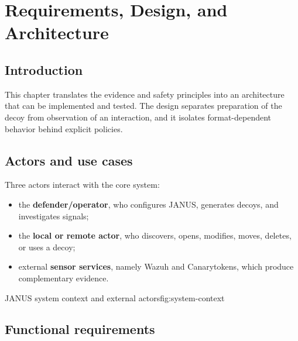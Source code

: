 \chapter{Requirements, Design, and Architecture}

\section{Introduction}

This chapter translates the evidence and safety principles into an architecture
that can be implemented and tested. The design separates preparation of the
decoy from observation of an interaction, and it isolates format-dependent
behavior behind explicit policies.

\section{Actors and use cases}

Three actors interact with the core system:

\begin{itemize}
  \item the \textbf{defender/operator}, who configures JANUS, generates decoys,
  and investigates signals;
  \item the \textbf{local or remote actor}, who discovers, opens, modifies,
  moves, deletes, or uses a decoy;
  \item external \textbf{sensor services}, namely Wazuh and Canarytokens, which
  produce complementary evidence.
\end{itemize}

{JANUS system context and external actors}{fig:system-context}

\section{Functional requirements}

